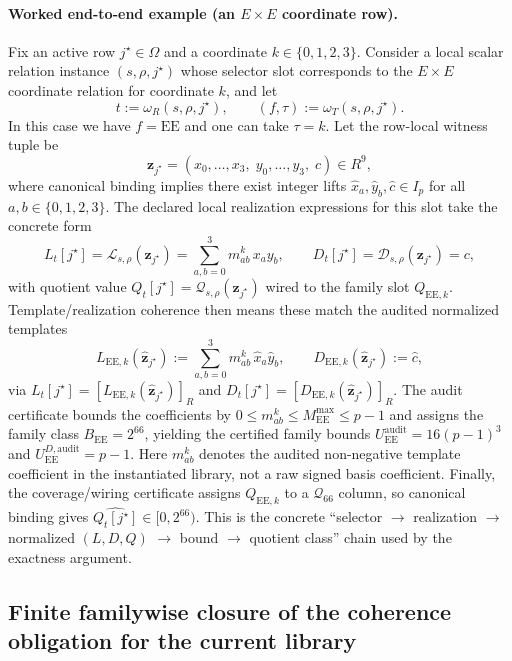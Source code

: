 ﻿\documentclass[11pt]{article}
\newcommand{\wt}[1]{\widehat{#1}}
\begin{document}
\paragraph{Worked end-to-end example (an \(E\times E\) coordinate row).}
Fix an active row \(j^\star\in\Omega\) and a coordinate \(k\in\{0,1,2,3\}\).
Consider a local scalar relation instance \((s,\rho,j^\star)\) whose selector
slot corresponds to the \(E\times E\) coordinate relation for coordinate \(k\),
and let
\[
t:=\omega_R(s,\rho,j^\star),
\qquad
(f,\tau):=\omega_T(s,\rho,j^\star).
\]
In this case we have \(f=\mathrm{EE}\) and one can take \(\tau=k\). Let the
row-local witness tuple be
\[
\mathbf z_{j^\star}=(x_0,\dots,x_3,\;y_0,\dots,y_3,\;c)\in R^{9},
\]
where canonical binding implies there exist integer lifts
\(\wt{x}_a,\wt{y}_b,\wt{c}\in I_p\) for all \(a,b\in\{0,1,2,3\}\). The declared
local realization expressions for this slot take the concrete form
\[
L_t[j^\star]
=
\mathcal L_{s,\rho}(\mathbf z_{j^\star})
=
\sum_{a,b=0}^{3} m_{ab}^k\,x_a y_b,
\qquad
D_t[j^\star]
=
\mathcal D_{s,\rho}(\mathbf z_{j^\star})
=
c,
\]
with quotient value \(Q_t[j^\star]=\mathcal Q_{s,\rho}(\mathbf z_{j^\star})\)
wired to the family slot \(Q_{\mathrm{EE},k}\). Template/realization coherence
then means these match the audited normalized templates
\[
L_{\mathrm{EE},k}(\wt{\mathbf z}_{j^\star})
:=
\sum_{a,b=0}^{3} m_{ab}^k\,\wt{x}_a \wt{y}_b,
\qquad
D_{\mathrm{EE},k}(\wt{\mathbf z}_{j^\star})
:=
\wt{c},
\]
via
\(
L_t[j^\star]=[L_{\mathrm{EE},k}(\wt{\mathbf z}_{j^\star})]_R
\)
and
\(
D_t[j^\star]=[D_{\mathrm{EE},k}(\wt{\mathbf z}_{j^\star})]_R
\).
The audit certificate bounds the coefficients by
\(0\le m_{ab}^k\le M_{\mathrm{EE}}^{\max}\le p-1\) and assigns the family class
\(B_{\mathrm{EE}}=2^{66}\), yielding the certified family bounds
\(
U_{\mathrm{EE}}^{\mathrm{audit}}=16(p-1)^3
\)
and
\(
U_{\mathrm{EE}}^{D,\mathrm{audit}}=p-1
\).
Here \(m_{ab}^k\) denotes the audited non-negative template coefficient in the
instantiated library, not a raw signed basis coefficient.
Finally, the coverage/wiring certificate assigns \(Q_{\mathrm{EE},k}\) to a
\(\mathcal Q_{66}\) column, so canonical binding gives
\(\wt{Q_t[j^\star]}\in[0,2^{66})\). This is the concrete
``selector \(\to\) realization \(\to\) normalized \((L,D,Q)\) \(\to\) bound
\(\to\) quotient class'' chain used by the exactness argument.

\subsection{Finite familywise closure of the coherence obligation for the current library}
\label{app:familywise-coherence}
\end{document}
